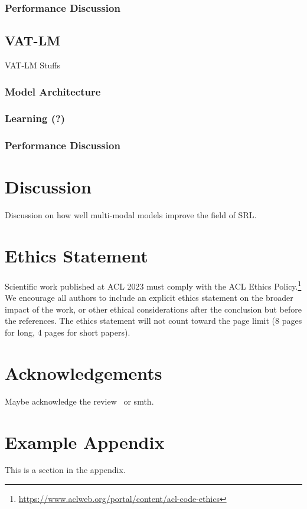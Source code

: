 \documentclass[11pt]{article}
\begin{document}
\subsubsection{Performance Discussion}

\subsection{VAT-LM}

VAT-LM Stuffs

\subsubsection{Model Architecture}
\subsubsection{Learning (?)}
\subsubsection{Performance Discussion}


\section{Discussion}
Discussion on how well multi-modal models improve the field of SRL.\@

\section*{Ethics Statement}
Scientific work published at ACL 2023 must comply with the ACL Ethics Policy.\footnote{\url{https://www.aclweb.org/portal/content/acl-code-ethics}} We encourage all authors to include an explicit ethics statement on the broader impact of the work, or other ethical considerations after the conclusion but before the references. The ethics statement will not count toward the page limit (8 pages for long, 4 pages for short papers).

\section*{Acknowledgements}
Maybe acknowledge the review~\cite{srl-review} or smth.




\appendix

\section{Example Appendix}\label{sec:appendix}

This is a section in the appendix.
\end{document}
